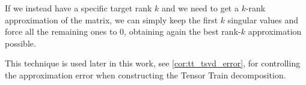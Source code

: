 If we instead have a specific target rank $k$ and we need to get a $k$-rank approximation of the matrix, we can simply keep the first $k$ singular values and force all the remaining ones to $0$, obtaining again the best rank-$k$ approximation possible.

This technique is used later in this work, see \eqref{cor:tt_tsvd_error}, for controlling the approximation error when constructing the Tensor Train decomposition.
